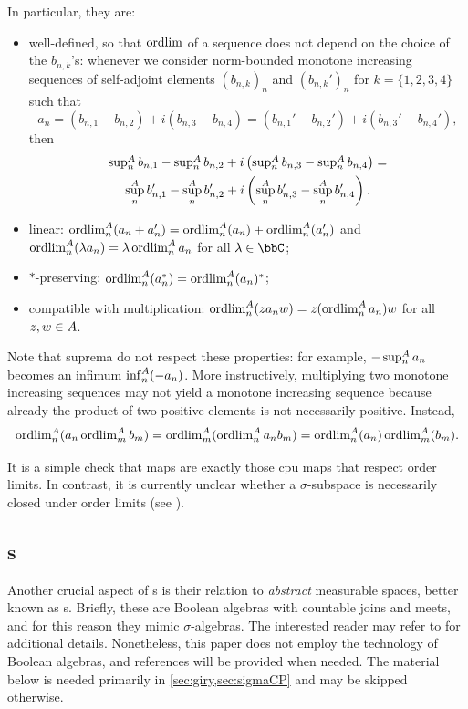 In particular, they are:
\begin{itemize}
	\item well-defined, so that $\operatorname{ordlim}$ of a sequence does not depend on the choice of the $b_{n,k}$'s: whenever we consider norm-bounded monotone increasing sequences of self-adjoint elements $(b_{n,k})_n$ and $(b_{n,k}')_n$ for $k=\lbrace 1,2,3,4\rbrace$ such that
	      \[
		      a_n=(b_{n,1} - b_{n,2})+i(b_{n,3}-b_{n,4})=(b_{n,1}' - b_{n,2}')+i(b_{n,3}'-b_{n,4}') ,
	      \]
	      then
	      \begin{multline}
								\textstyle
		      \sup_n^{{A}} b_{n,1} - \sup_n^{{A}} b_{n,2} + i \left(\sup_n^{{A}} b_{n,3} - \sup_n^{{A}} b_{n,4}\right) =\\ \sup_n^{{A}} b_{n,1}' - \sup_n^{{A}} b_{n,2}' + i \left(\sup_n^{{A}} b_{n,3}' - \sup_n^{{A}} b_{n,4}' \right).
							\end{multline}
	\item linear: $\operatorname{ordlim}^{{A}}_n (a_n + a_n')=\operatorname{ordlim}^{{A}}_n (a_n)+ \operatorname{ordlim}^{{A}}_n (a_n')$ and $\operatorname{ordlim}^{{A}}_n(\lambda a_n) = \lambda \operatorname{ordlim}^{{A}}_n a_n$ for all $\lambda \in \bbC$;
	\item $*$-preserving: $\operatorname{ordlim}^{{A}}_n (a_n^*)=\operatorname{ordlim}^{{A}}_n(a_n)^*$;
	\item compatible with multiplication: $\operatorname{ordlim}^{{A}}_n (z a_n w) = z(\operatorname{ordlim}^{{A}}_n a_n)w$ for all $z,w \in {A}$.
\end{itemize}
Note that suprema do not respect these properties: for example, $-\sup^{{A}}_n a_n $ becomes an infimum $\inf^{{A}}_n (-a_n)$.
More instructively, multiplying two monotone increasing sequences may not yield a monotone increasing sequence because already the product of two positive elements is not necessarily positive.
Instead, 
\[ \operatorname{ordlim}^{{A}}_n(a_n \operatorname{ordlim}^{{A}}_m b_m)= \operatorname{ordlim}^{{A}}_m (\operatorname{ordlim}^{{A}}_n a_n b_m)=\operatorname{ordlim}^{{A}}_n (a_n)\operatorname{ordlim}^{{A}}_m(b_m).\]

It is a simple check that \scpu{} maps are exactly those cpu maps that respect order limits.
In contrast, it is currently unclear whether a $\sigma$-subspace is necessarily closed under order limits (see \cite[Section 3.5]{fritz2025categories}).

\subsection*{\texorpdfstring{\bsigma{}s}{Boolean σ-algebras}}
Another crucial aspect of \cstars{}s is their relation to \emph{abstract} measurable spaces, better known as \bsigma{}s.
Briefly, these are Boolean algebras with countable joins and meets, and for this reason they mimic $\sigma$-algebras.
The interested reader may refer to \cite{sikorski69boolean} for additional details.
Nonetheless, this paper does not employ the technology of Boolean algebras, and references will be provided when needed.
The material below is needed primarily in \cref{sec:giry,sec:sigmaCP} and may be skipped otherwise.

